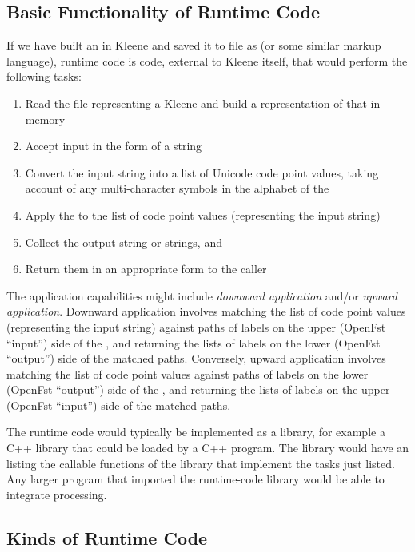 \subsection{Basic Functionality of Runtime Code}

If we have built an \fsm{} in Kleene and saved it to file as  (or some similar markup
language), runtime code is
code, external to Kleene itself, that would perform the following tasks:

\begin{enumerate}
\item
Read the  file representing a Kleene \fsm{} and build a
representation of that \fsm{} in memory
\item
Accept input in the form of a string
\item
Convert the input string into a list of Unicode code point values, taking account of
any multi-character symbols in the alphabet of the \fsm{}
\item
Apply the \fsm{} to the list of code point values (representing the input string)
\item
Collect the output string or strings, and
\item
Return them in an appropriate form to the caller
\end{enumerate}

\noindent
The application capabilities might include \emph{downward application} and/or \emph{upward
application}.  Downward application involves matching the list
of code point values (representing the input string) against paths of labels on the upper (OpenFst ``input'') side of the
\fsm{}, and returning the lists of labels on the lower (OpenFst ``output'') side of the
matched paths.  Conversely, upward application involves matching the list of code point
values against paths of labels on the lower (OpenFst ``output'') side of the \fsm{}, and
returning the lists of labels on the upper (OpenFst ``input'') side of the matched paths.

The runtime code would typically be implemented as a library, for example a C++ library that
could be loaded
by a C++ program.  The library would have an  listing the callable functions of the library
that implement the tasks just listed.  Any larger program that imported the
runtime-code library would be able to integrate \fsm{} processing.

\subsection{Kinds of Runtime Code}

